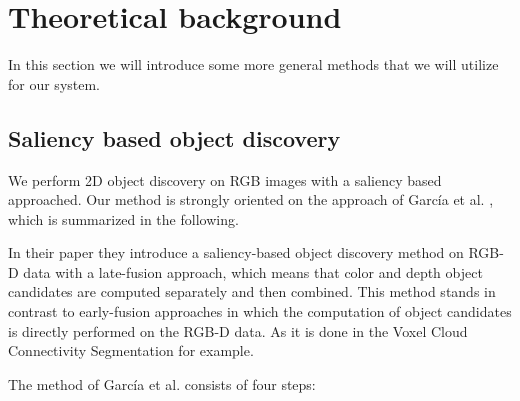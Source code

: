 \documentclass[a4paper,11pt,english]{article}
\begin{document}
\section{Theoretical background}
\label{background}
In this section we will introduce some more general methods that we will utilize for our system.

\subsection{Saliency based object discovery}
\label{background:saliencyobjectdiscovery}
We perform 2D object discovery on RGB images with a saliency based approached.
Our method is strongly oriented on the approach of García et al. \cite{garcia2015saliency}, which is summarized in the following.

In their paper they introduce a saliency-based object discovery method on RGB-D data with a late-fusion approach, which means that color and depth object candidates are computed separately and then combined.
This method stands in contrast to early-fusion approaches in which the computation of object candidates is directly performed on the RGB-D data. As it is done in the Voxel Cloud Connectivity Segmentation \cite{papon2013voxel} for example. 

The method of García et al. consists of four steps:
\end{document}
